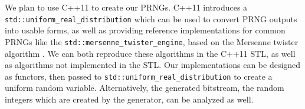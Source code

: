We plan to use C++11 to create our PRNGs. C++11 introduces a \texttt{std::uniform\_real\_distribution} \cite{uniformrealdistribution} which can be used to convert PRNG outputs into usable forms, as well as providing reference implementations for common PRNGs like the \texttt{std::mersenne\_twister\_engine}, based on the Mersenne twister algorithm \cite{Matsumoto:1998:MTE:272991.272995}. We can both reproduce these algorithms in the C++11 STL, as well as algorithms not implemented in the STL. Our implementations can be designed as functors, then passed to \texttt{std::uniform\_real\_distribution} to create a uniform random variable. Alternatively, the generated bitstream, the random integers which are created by the generator, can be analyzed as well.
